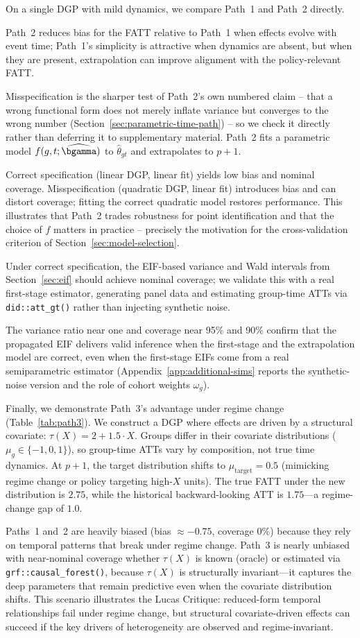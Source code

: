 \documentclass{article}
\begin{document}
On a single DGP with mild dynamics, we compare Path~1 and Path~2 directly.

Path~2 reduces bias for the FATT relative to Path~1 when effects evolve with event time; Path~1's simplicity is attractive when dynamics are absent, but when they are present, extrapolation can improve alignment with the policy-relevant FATT.

Misspecification is the sharper test of Path~2's own numbered claim -- that a wrong functional form does not merely inflate variance but converges to the wrong number (Section~\ref{sec:parametric-time-path}) -- so we check it directly rather than deferring it to supplementary material. Path~2 fits a parametric model $f(g,t;\widehat{\bgamma})$ to $\widehat{\theta}_{gt}$ and extrapolates to $p+1$.

Correct specification (linear DGP, linear fit) yields low bias and nominal coverage. Misspecification (quadratic DGP, linear fit) introduces bias and can distort coverage; fitting the correct quadratic model restores performance. This illustrates that Path~2 trades robustness for point identification and that the choice of $f$ matters in practice -- precisely the motivation for the cross-validation criterion of Section~\ref{sec:model-selection}.

Under correct specification, the EIF-based variance and Wald intervals from Section~\ref{sec:eif} should achieve nominal coverage; we validate this with a real first-stage estimator, generating panel data and estimating group-time ATTs via \texttt{did::att\_gt()} rather than injecting synthetic noise.

The variance ratio near one and coverage near 95\% and 90\% confirm that the propagated EIF delivers valid inference when the first-stage and the extrapolation model are correct, even when the first-stage EIFs come from a real semiparametric estimator (Appendix~\ref{app:additional-sims} reports the synthetic-noise version and the role of cohort weights $\omega_g$).

Finally, we demonstrate Path~3's advantage under regime change (Table~\ref{tab:path3}). We construct a DGP where effects are driven by a structural covariate: $\tau(X) = 2 + 1.5 \cdot X$. Groups differ in their covariate distributions ($\mu_g \in \{-1, 0, 1\}$), so group-time ATTs vary by composition, not true time dynamics. At $p+1$, the target distribution shifts to $\mu_{\text{target}} = 0.5$ (mimicking regime change or policy targeting high-$X$ units). The true FATT under the new distribution is $2.75$, while the historical backward-looking ATT is $1.75$---a regime-change gap of $1.0$.

Paths~1 and~2 are heavily biased (bias $\approx -0.75$, coverage $0\%$) because they rely on temporal patterns that break under regime change. Path~3 is nearly unbiased with near-nominal coverage whether $\tau(X)$ is known (oracle) or estimated via \texttt{grf::causal\_forest()}, because $\tau(X)$ is structurally invariant---it captures the deep parameters that remain predictive even when the covariate distribution shifts. This scenario illustrates the Lucas Critique: reduced-form temporal relationships fail under regime change, but structural covariate-driven effects can succeed if the key drivers of heterogeneity are observed and regime-invariant.
\end{document}
